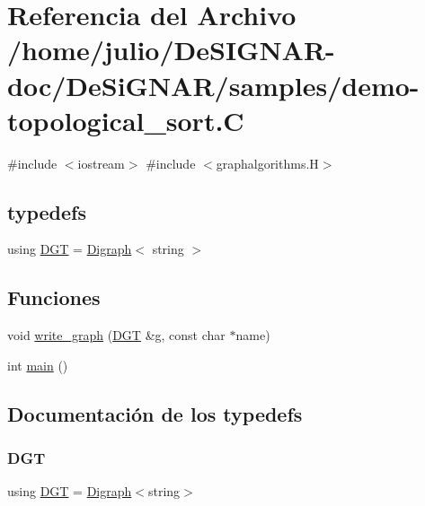 \hypertarget{demo-topological__sort_8_c}{}\section{Referencia del Archivo /home/julio/\+De\+S\+I\+G\+N\+A\+R-\/doc/\+De\+Si\+G\+N\+A\+R/samples/demo-\/topological\+\_\+sort.C}
\label{demo-topological__sort_8_c}
{\ttfamily \#include $<$iostream$>$}\newline
{\ttfamily \#include $<$graphalgorithms.\+H$>$}\newline
\subsection*{typedefs}
\begin{DoxyCompactItemize}
\item 
using \hyperlink{demo-topological__sort_8_c_a8f123599e859454680bf37e203c0b18b}{D\+GT} = \hyperlink{class_designar_1_1_digraph}{Digraph}$<$ string $>$
\end{DoxyCompactItemize}
\subsection*{Funciones}
\begin{DoxyCompactItemize}
\item 
void \hyperlink{demo-topological__sort_8_c_ab82a33da73b0e5278780967809b0791d}{write\+\_\+graph} (\hyperlink{demo-buildgraph_8_c_ae73e956c2a8cf0a58255aa6b659985e0}{D\+GT} \&g, const char $\ast$name)
\item 
int \hyperlink{demo-topological__sort_8_c_ae66f6b31b5ad750f1fe042a706a4e3d4}{main} ()
\end{DoxyCompactItemize}


\subsection{Documentación de los \textquotesingle{}typedefs\textquotesingle{}}
\mbox{\label{demo-topological__sort_8_c_a8f123599e859454680bf37e203c0b18b}} 
\subsubsection{\texorpdfstring{D\+GT}{DGT}}
{\footnotesize\ttfamily using \hyperlink{demo-buildgraph_8_c_ae73e956c2a8cf0a58255aa6b659985e0}{D\+GT} =  \hyperlink{class_designar_1_1_digraph}{Digraph}$<$string$>$}



